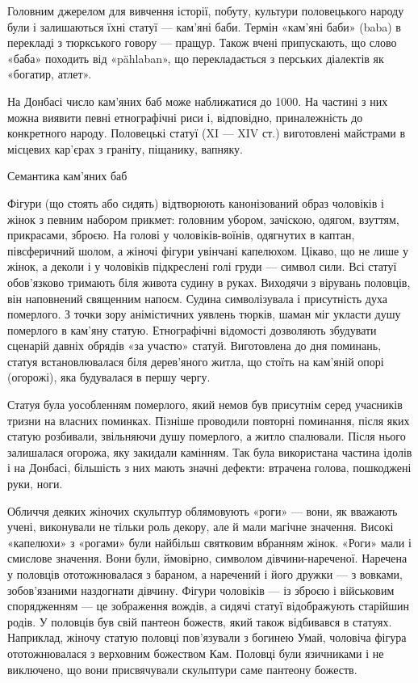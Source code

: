 Головним джерелом для вивчення історії, побуту, культури половецького народу
були і залишаються їхні статуї — кам'яні баби. Термін «кам'яні баби» (baba) в
перекладі з тюркського говору — пращур. Також вчені припускають, що слово
«баба» походить від «pählaban», що перекладається з перських діалектів як
«богатир, атлет».

На Донбасі число кам'яних баб може наближатися до 1000. На частині з них можна
виявити певні етнографічні риси і, відповідно, приналежність до конкретного
народу. Половецькі статуї (XI — XIV ст.) виготовлені майстрами в місцевих
кар'єрах з граніту, піщанику, вапняку.

Семантика кам'яних баб

Фігури (що стоять або сидять) відтворюють канонізований образ чоловіків і жінок
з певним набором прикмет: головним убором, зачіскою, одягом, взуттям,
прикрасами, зброєю. На голові у чоловіків-воїнів, одягнутих в каптан,
півсферичний шолом, а жіночі фігури увінчані капелюхом. Цікаво, що не лише у
жінок, а деколи і у чоловіків підкреслені голі груди — символ сили. Всі статуї
обов'язково тримають біля живота судину в руках. Виходячи з вірувань половців,
він наповнений священним напоєм. Судина символізувала і присутність духа
померлого. З точки зору анімістичних уявлень тюрків, шаман міг укласти душу
померлого в кам'яну статую. Етнографічні відомості дозволяють збудувати
сценарій давніх обрядів «за участю» статуй. Виготовлена до дня поминань, статуя
встановлювалася біля дерев'яного житла, що стоїть на кам'яній опорі (огорожі),
яка будувалася в першу чергу.

Статуя була уособленням померлого, який немов був присутнім серед учасників
тризни на власних поминках. Пізніше проводили повторні поминання, після яких
статую розбивали, звільняючи душу померлого, а житло спалювали. Після нього
залишалася огорожа, яку закидали камінням. Так була використана частина ідолів
і на Донбасі, більшість з них мають значні дефекти: втрачена голова, пошкоджені
руки, ноги.

Обличчя деяких жіночих скульптур облямовують «роги» — вони, як вважають учені,
виконували не тільки роль декору, але й мали магічне значення. Високі
«капелюхи» з «рогами» були найбільш святковим вбранням жінок. «Роги» мали і
смислове значення. Вони були, ймовірно, символом дівчини-нареченої. Наречена у
половців ототожнювалася з бараном, а наречений і його дружки — з вовками,
зобов'язаними наздогнати дівчину. Фігури чоловіків — із зброєю і військовим
спорядженням — це зображення вождів, а сидячі статуї відображують старійшин
родів. У половців був свій пантеон божеств, який також відбивався в статуях.
Наприклад, жіночу статую половці пов'язували з богинею Умай, чоловіча фігура
ототожнювалася з верховним божеством Кам. Половці були язичниками і не
виключено, що вони присвячували скульптури саме пантеону божеств.

